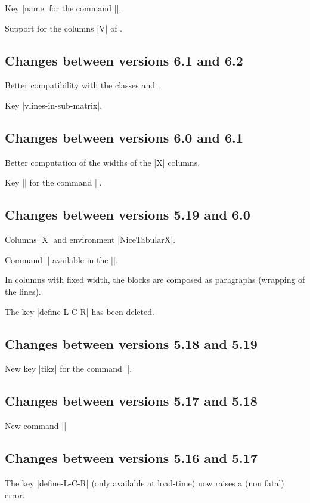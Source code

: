 \documentclass[dvipsnames]{article}%
\begin{document}
Key |name| for the command |\Block|.

Support for the columns |V| of .

\subsection*{Changes between versions 6.1 and 6.2}

Better compatibility with the classes  and .

Key |vlines-in-sub-matrix|.

\subsection*{Changes between versions 6.0 and 6.1}

Better computation of the widths of the |X| columns.

Key |\color| for the command |\RowStyle|.

\subsection*{Changes between versions 5.19 and 6.0}

Columns |X| and environment |{NiceTabularX}|.

Command |\rowlistcolors| available in the |\CodeBefore|.

In columns with fixed width, the blocks are composed as paragraphs (wrapping
of the lines).

The key |define-L-C-R| has been deleted.

\subsection*{Changes between versions 5.18 and 5.19}

New key |tikz| for the command |\Block|.

\subsection*{Changes between versions 5.17 and 5.18}

New command |\RowStyle|

\subsection*{Changes between versions 5.16 and 5.17}

The key |define-L-C-R| (only available at load-time) now raises a (non fatal)
error.
\end{document}
